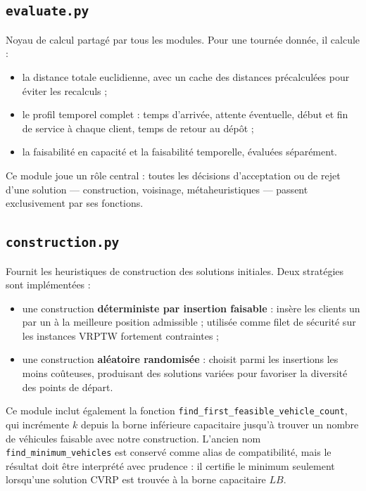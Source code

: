 \documentclass[11pt,a4paper]{article}
\begin{document}
\subsection{\texttt{evaluate.py}}
Noyau de calcul partagé par tous les modules. Pour une tournée donnée, il calcule :
\begin{itemize}
    \item la distance totale euclidienne, avec un cache des distances précalculées pour éviter les recalculs ;
    \item le profil temporel complet : temps d'arrivée, attente éventuelle, début et fin de service à chaque client, temps de retour au dépôt ;
    \item la faisabilité en capacité et la faisabilité temporelle, évaluées séparément.
\end{itemize}
Ce module joue un rôle central : toutes les décisions d'acceptation ou de rejet d'une solution — construction, voisinage, métaheuristiques — passent exclusivement par ses fonctions.

\subsection{\texttt{construction.py}}
Fournit les heuristiques de construction des solutions initiales. Deux stratégies sont implémentées :
\begin{itemize}
    \item une construction \textbf{déterministe par insertion faisable} : insère les clients un par un à la meilleure position admissible ; utilisée comme filet de sécurité sur les instances VRPTW fortement contraintes ;
    \item une construction \textbf{aléatoire randomisée} : choisit parmi les insertions les moins coûteuses, produisant des solutions variées pour favoriser la diversité des points de départ.
\end{itemize}
Ce module inclut également la fonction \texttt{find\_first\_feasible\_vehicle\_count}, qui incrémente \(k\) depuis la borne inférieure capacitaire jusqu'à trouver un nombre de véhicules faisable avec notre construction. L'ancien nom \texttt{find\_minimum\_vehicles} est conservé comme alias de compatibilité, mais le résultat doit être interprété avec prudence : il certifie le minimum seulement lorsqu'une solution CVRP est trouvée à la borne capacitaire \(LB\).
\end{document}
